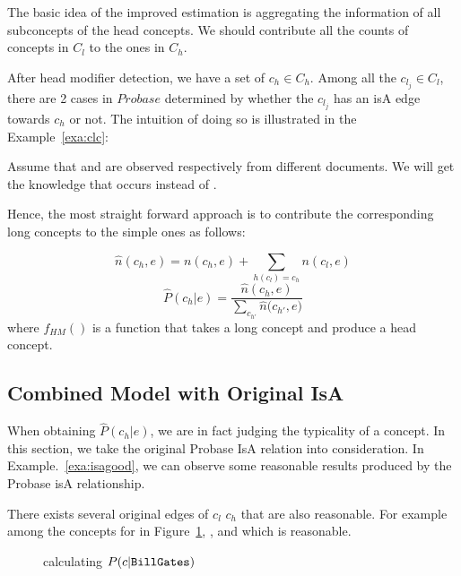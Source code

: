 The basic idea of the improved estimation is aggregating the information of all subconcepts of the head concepts.
We should contribute all the counts of concepts in $C_{l}$ to the ones in $C_{h}$.

After head modifier detection, we have a set of ${c_h} \in C_{h}$.
Among all the $c_{l_j}\in C_{l}$, there are 2 cases in $Probase$ determined by whether the $c_{l_j}$ has an isA edge towards ${c_h}$ or not.
The intuition of doing so is illustrated in the Example~\ref{exa:clc}:
\begin{example}
\label{exa:clc}
Assume that   and  are observed respectively  from different documents.
We will get the knowledge that  occurs  instead of .
\end{example}
Hence, the most straight forward approach is to contribute the corresponding long concepts to the simple ones as follows:

$$\hat{n}(c_h, e)={n}(c_h, e)+\sum_{ h(c_l)=c_h} n(c_l,e)$$
$$\hat{P}(c_h|e)=\frac{\hat{n}(c_h, e)}{\sum_{c_{h'}}{\hat{n}(c_{h'}}, e)}$$
where $f_{HM}()$ is a function that takes a long concept and produce a head concept.


\subsection{Combined Model with Original IsA}
When obtaining $\hat{P}(c_h|e)$, we are in fact judging the typicality of a concept.
In this section, we take the original Probase IsA relation into consideration. In Example.~\ref{exa:isagood}, we can observe some reasonable results produced by the Probase isA relationship.

\begin{example}
\label{exa:isagood}
There exists several original edges of $c_l$ \isa $c_h$ that are also reasonable. 
For example among the concepts for  in Figure~\ref{fig:pgge},  \isa {}, and  \isa {} which is reasonable.
\end{example}

\begin{figure}[!hptb]
\label{fig:pgge}
\centering
{}%
\caption{calculating $P({c}|{\tt Bill Gates})$ }
\end{figure}

